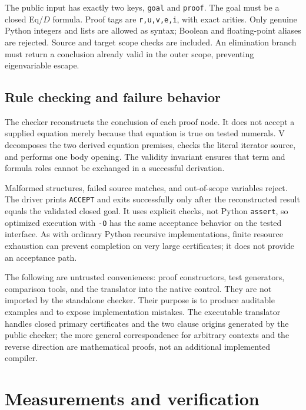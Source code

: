 \documentclass[11pt]{article}
\theoremstyle{definition}\newtheorem{definition}[theorem]{Definition}
\theoremstyle{remark}\newtheorem{remark}[theorem]{Remark}
\begin{document}
The public input has exactly two keys, \texttt{goal} and \texttt{proof}. The goal must be a closed Eq/$D$ formula. Proof tags are \texttt{r,u,v,e,i}, with exact arities. Only genuine Python integers and lists are allowed as syntax; Boolean and floating-point aliases are rejected. Source and target scope checks are included. An elimination branch must return a conclusion already valid in the outer scope, preventing eigenvariable escape.

\subsection{Rule checking and failure behavior}

The checker reconstructs the conclusion of each proof node. It does not accept a supplied equation merely because that equation is true on tested numerals. V decomposes the two derived equation premises, checks the literal iterator source, and performs one body opening. The validity invariant ensures that term and formula roles cannot be exchanged in a successful derivation.

Malformed structures, failed source matches, and out-of-scope variables reject. The driver prints \texttt{ACCEPT} and exits successfully only after the reconstructed result equals the validated closed goal. It uses explicit checks, not Python \texttt{assert}, so optimized execution with \texttt{-O} has the same acceptance behavior on the tested interface. As with ordinary Python recursive implementations, finite resource exhaustion can prevent completion on very large certificates; it does not provide an acceptance path.

The following are untrusted conveniences: proof constructors, test generators, comparison tools, and the translator into the native control. They are not imported by the standalone checker. Their purpose is to produce auditable examples and to expose implementation mistakes. The executable translator handles closed primary certificates and the two clause origins generated by the public checker; the more general correspondence for arbitrary contexts and the reverse direction are mathematical proofs, not an additional implemented compiler.

\section{Measurements and verification}
\label{sec:measurements}
\end{document}
